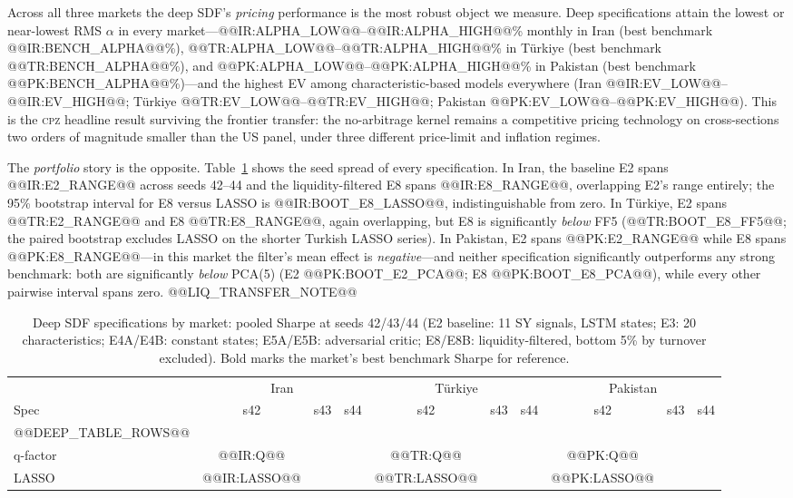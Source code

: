 \documentclass[12pt]{article}
\begin{document}
Across all three markets the deep SDF's \emph{pricing} performance is the most robust object we measure. Deep specifications attain the lowest or near-lowest RMS $\alpha$ in every market---@@IR:ALPHA_LOW@@--@@IR:ALPHA_HIGH@@\% monthly in Iran (best benchmark @@IR:BENCH_ALPHA@@\%), @@TR:ALPHA_LOW@@--@@TR:ALPHA_HIGH@@\% in T\"urkiye (best benchmark @@TR:BENCH_ALPHA@@\%), and @@PK:ALPHA_LOW@@--@@PK:ALPHA_HIGH@@\% in Pakistan (best benchmark @@PK:BENCH_ALPHA@@\%)---and the highest EV among characteristic-based models everywhere (Iran @@IR:EV_LOW@@--@@IR:EV_HIGH@@; T\"urkiye @@TR:EV_LOW@@--@@TR:EV_HIGH@@; Pakistan @@PK:EV_LOW@@--@@PK:EV_HIGH@@). This is the \textsc{cpz} headline result surviving the frontier transfer: the no-arbitrage kernel remains a competitive pricing technology on cross-sections two orders of magnitude smaller than the US panel, under three different price-limit and inflation regimes.

The \emph{portfolio} story is the opposite. Table~\ref{tab:deep} shows the seed spread of every specification. In Iran, the baseline E2 spans @@IR:E2_RANGE@@ across seeds 42--44 and the liquidity-filtered E8 spans @@IR:E8_RANGE@@, overlapping E2's range entirely; the 95\% bootstrap interval for E8 versus LASSO is @@IR:BOOT_E8_LASSO@@, indistinguishable from zero. In T\"urkiye, E2 spans @@TR:E2_RANGE@@ and E8 @@TR:E8_RANGE@@, again overlapping, but E8 is significantly \emph{below} FF5 (@@TR:BOOT_E8_FF5@@; the paired bootstrap excludes LASSO on the shorter Turkish LASSO series). In Pakistan, E2 spans @@PK:E2_RANGE@@ while E8 spans @@PK:E8_RANGE@@---in this market the filter's mean effect is \emph{negative}---and neither specification significantly outperforms any strong benchmark: both are significantly \emph{below} PCA(5) (E2 @@PK:BOOT_E2_PCA@@; E8 @@PK:BOOT_E8_PCA@@), while every other pairwise interval spans zero. @@LIQ_TRANSFER_NOTE@@

\begin{table}[htbp]
\centering
\footnotesize
\setlength{\tabcolsep}{3.5pt}
\caption{Deep SDF specifications by market: pooled Sharpe at seeds 42/43/44 (E2 baseline: 11 SY signals, LSTM states; E3: 20 characteristics; E4A/E4B: constant states; E5A/E5B: adversarial critic; E8/E8B: liquidity-filtered, bottom 5\% by turnover excluded). Bold marks the market's best benchmark Sharpe for reference.}
\label{tab:deep}
\begin{tabular}{l ccc ccc ccc}
\toprule
 & \multicolumn{3}{c}{Iran} & \multicolumn{3}{c}{T\"urkiye} & \multicolumn{3}{c}{Pakistan} \\
\cmidrule(lr){2-4}\cmidrule(lr){5-7}\cmidrule(lr){8-10}
Spec & s42 & s43 & s44 & s42 & s43 & s44 & s42 & s43 & s44 \\
\midrule
@@DEEP_TABLE_ROWS@@
\midrule
\multicolumn{10}{l}{\emph{Benchmarks for reference:}} \\
q-factor & @@IR:Q@@ & & & @@TR:Q@@ & & & @@PK:Q@@ & & \\
LASSO & @@IR:LASSO@@ & & & @@TR:LASSO@@ & & & @@PK:LASSO@@ & & \\
\bottomrule
\end{tabular}
\end{table}
\end{document}
